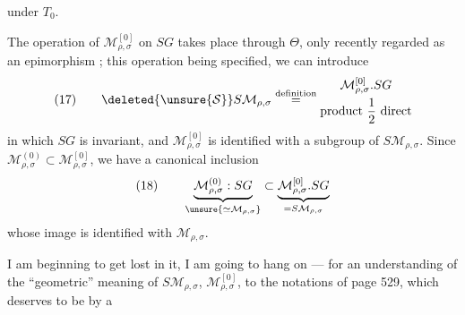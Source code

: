 
 under $T_0$. 

The operation of $\mathcal M_{\rho,\sigma}^{[0]}$ on $SG$ takes place
through $\Theta$, only recently regarded as an epimorphism
;
this operation being specified, we can introduce
\[
(17)\qquad\deleted{\unsure{\mathcal S}}
S\mathcal M_{\rho,\sigma}\overset{\text{definition}}{=}
\begin{gathered}
\mathcal M_{\rho,\sigma}^{[0]}.SG\\
\text{product }\frac12\text{ direct}
\end{gathered}
\]
in which $SG$ is invariant, and $\mathcal M_{\rho,\sigma}^{[0]}$ is identified
with a subgroup of $S\mathcal M_{\rho,\sigma}$. Since
$\mathcal M_{\rho,\sigma}^{(0)}\subset\mathcal M_{\rho,\sigma}^{[0]}$,
we have a canonical inclusion
\[
(18)\qquad
\underbrace{\mathcal M_{\rho,\sigma}^{(0)}:SG}_{\unsure{\simeq\mathcal M_{\rho,\sigma}}}
\subset
\underbrace{\mathcal M_{\rho,\sigma}^{[0]}.SG}_{=S\mathcal M_{\rho,\sigma}}
\]
whose image is 
identified with $\mathcal M_{\rho,\sigma}$.

 I am beginning  to get lost in it, I am going to hang on
--- for an understanding of the ``geometric'' meaning of
$S\mathcal M_{\rho,\sigma}$, $\mathcal M_{\rho,\sigma}^{[0]}$, to the notations
of page 529, which deserves to be  by a



